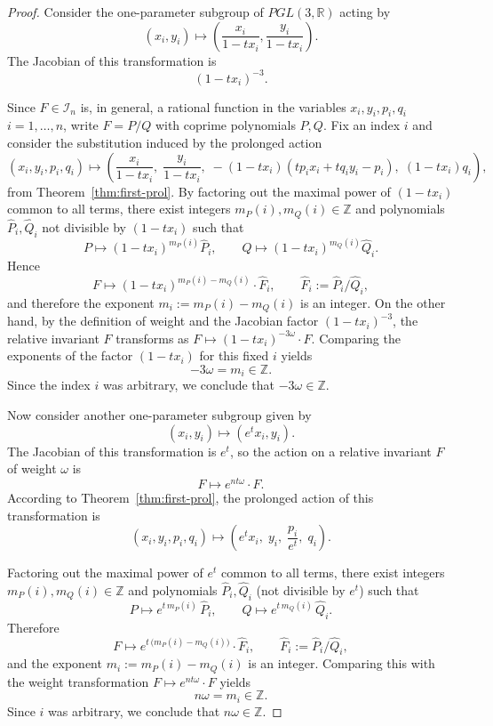 \documentclass[12pt,reqno]{amsart}
\begin{document}
\begin{proof}

Consider the one-parameter subgroup of \( PGL(3, \mathbb{R}) \) acting by
\[
(x_i, y_i) \mapsto \left( \frac{x_i}{1 - tx_i}, \frac{y_i}{1 - tx_i} \right).
\]
The Jacobian of this transformation is
\[
(1 - tx_i)^{-3}.
\]


Since \(F\in\mathcal{I}_n\) is, in general, a rational function in the variables
\(x_i,y_i,p_i,q_i\) $i=1,\ldots, n$, write \(F=P/Q\) with coprime polynomials \(P,Q\).
Fix an index \(i\) and consider the substitution induced by the prolonged action 
\[
(x_i, y_i, p_i, q_i) \mapsto \left(
\frac{x_i}{1 - tx_i},\;
\frac{y_i}{1 - tx_i},\;
-(1 - tx_i)\left( t p_i x_i + t q_i y_i - p_i \right),\;
(1 - tx_i) q_i
\right),
\]
from Theorem~\ref{thm:first-prol}.
By factoring out the maximal power of \((1-tx_i)\) common to all terms, there exist integers
\(m_P(i),m_Q(i)\in\mathbb{Z}\) and polynomials \(\widehat P_i,\widehat Q_i\) not divisible by \((1-tx_i)\) such that
\[
P \mapsto(1-tx_i)^{m_P(i)}\widehat P_i,\qquad
Q\mapsto(1-tx_i)^{m_Q(i)}\widehat Q_i.
\]
Hence
\[
F \mapsto(1-tx_i)^{m_P(i)-m_Q(i)}\cdot \widehat F_i,\qquad
\widehat F_i:=\widehat P_i/\widehat Q_i,
\]
and therefore the exponent \(m_i:=m_P(i)-m_Q(i)\) is an integer.
On the other hand, by the definition of weight and the Jacobian factor \((1-tx_i)^{-3}\),
the relative invariant \(F\) transforms as
\(
F \mapsto (1-tx_i)^{-3\omega}\cdot F.
\)
Comparing the exponents of the factor \((1-tx_i)\) for this fixed \(i\) yields
\[
-3\omega=m_i\in\mathbb{Z}.
\]
Since the index \(i\) was arbitrary, we conclude that \(-3\omega\in\mathbb{Z}\).


Now consider another one-parameter subgroup given by
\[
(x_i, y_i) \mapsto (e^t x_i, y_i).
\]
The Jacobian of this transformation is \( e^t \), so the action on a relative invariant \( F \) of weight \( \omega \) is
\[
F \mapsto e^{nt\omega} \cdot F.
\]
According to Theorem~\ref{thm:first-prol}, the prolonged action of this transformation is
\[
(x_i, y_i, p_i, q_i) \mapsto \left(e^t x_i,\; y_i,\; \frac{p_i}{e^t},\; q_i\right).
\]


Factoring out the maximal power of \(e^t\) common to all terms, there exist integers \(m_P(i),m_Q(i)\in\mathbb{Z}\) and polynomials \(\widehat P_i,\widehat Q_i\) (not divisible by \(e^t\)) such that
\[
P \mapsto e^{t\,m_P(i)}\,\widehat P_i,\qquad
Q \mapsto e^{t\,m_Q(i)}\,\widehat Q_i.
\]
Therefore
\[
F \mapsto e^{t\,\bigl(m_P(i)-m_Q(i)\bigr)}\cdot \widehat F_i,\qquad
\widehat F_i:=\widehat P_i/\widehat Q_i,
\]
and the exponent \(m_i:=m_P(i)-m_Q(i)\) is an integer. Comparing this with the weight transformation
\(
F \mapsto e^{n t \omega}\cdot F
\)
yields
\[
n\omega = m_i \in \mathbb{Z}.
\]
Since \(i\) was arbitrary, we conclude that \(n\omega\in\mathbb{Z}\).




\end{proof}
\end{document}
